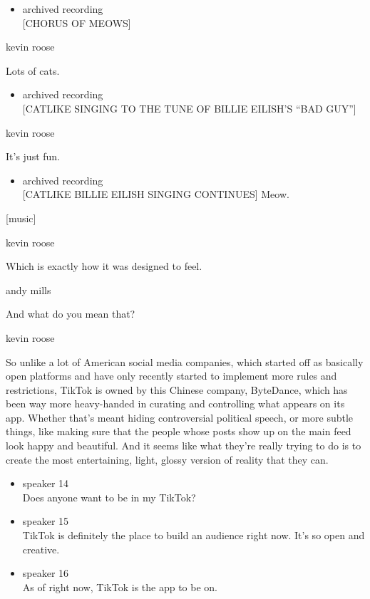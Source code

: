 \begin{itemize}
\tightlist
\item
  archived recording\\
  {[}CHORUS OF MEOWS{]}
\end{itemize}

kevin roose

Lots of cats.

\begin{itemize}
\tightlist
\item
  archived recording\\
  {[}CATLIKE SINGING TO THE TUNE OF BILLIE EILISH'S ``BAD GUY''{]}
\end{itemize}

kevin roose

It's just fun.

\begin{itemize}
\tightlist
\item
  archived recording\\
  {[}CATLIKE BILLIE EILISH SINGING CONTINUES{]} Meow.
\end{itemize}

{[}music{]}

kevin roose

Which is exactly how it was designed to feel.

andy mills

And what do you mean that?

kevin roose

So unlike a lot of American social media companies, which started off as
basically open platforms and have only recently started to implement
more rules and restrictions, TikTok is owned by this Chinese company,
ByteDance, which has been way more heavy-handed in curating and
controlling what appears on its app. Whether that's meant hiding
controversial political speech, or more subtle things, like making sure
that the people whose posts show up on the main feed look happy and
beautiful. And it seems like what they're really trying to do is to
create the most entertaining, light, glossy version of reality that they
can.

\begin{itemize}
\item
  speaker 14\\
  Does anyone want to be in my TikTok?
\item
  speaker 15\\
  TikTok is definitely the place to build an audience right now. It's so
  open and creative.
\item
  speaker 16\\
  As of right now, TikTok is the app to be on.
\end{itemize}

